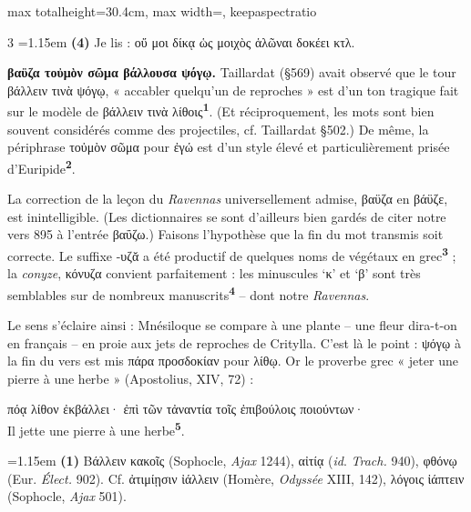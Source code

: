 \documentclass[11pt,twoside]{book}
\newcommand{\italique}[1]{\textit{#1}}
\newcommand{\citComm}[1]{\begin{quoting}[vskip=0.4pt,leftmargin=0.7em,rightmargin=0.2em]#1\end{quoting}}
\newcommand{\marqueur}[1]{\textsuperscript{\color{rubricRed}\textbf{#1}}}
\begin{document}
\begin{adjustbox}{max totalheight=30.4cm, max width=\textwidth, keepaspectratio}
\begin{minipage}{\textwidth}
{\begin{multicols}{3}
\noindent\hangindent=1.15em {\color{sepiaNote}\textbf{(4)}} Je lis : οὔ μοι δίκᾳ ὡς μοιχὸς ἁλῶναι δοκέει κτλ.
\par\vspace{1.5pt}
 \textbf{βαϋζα τοὐμὸν σῶμα βάλλουσα ψόγῳ.} Taillardat (§569) avait observé que le tour βάλλειν τινὰ ψόγῳ, « accabler quelqu'un de reproches » est d'un ton tragique fait sur le modèle de βάλλειν τινὰ λίθοις\marqueur{1}. (Et réciproquement, les mots sont bien souvent considérés comme des projectiles, cf. Taillardat §502.)  De même, la périphrase τοὐμὸν σῶμα pour ἐγώ est d'un style élevé et particulièrement prisée d'Euripide\marqueur{2}.
\par\vspace{1.5pt}
\noindent La correction de la leçon du \italique{Ravennas} universellement admise, βαϋζα en βάϋζε, est inintelligible. (Les dictionnaires se sont d'ailleurs bien gardés de citer notre vers 895 à l'entrée βαΰζω.) Faisons l'hypothèse que la fin du mot transmis soit correcte. Le suffixe -υζᾰ a été productif de quelques noms de végétaux en grec\marqueur{3} ; la \italique{conyze}, κόνυζα convient parfaitement : les minuscules `κ' et `β' sont très semblables sur de nombreux manuscrits\marqueur{4} -- dont notre \italique{Ravennas}.
\par\vspace{1.5pt}
\noindent Le sens s'éclaire ainsi : Mnésiloque se compare à une plante -- une fleur dira-t-on en français -- en proie aux jets de reproches de Critylla. C'est là le point : ψόγῳ à la fin du vers est mis πάρα προσδοκίαν pour λίθῳ. Or le proverbe grec « jeter une pierre à une herbe » (Apostolius, XIV, 72) :
\citComm{πόᾳ λίθον ἐκβάλλει· ἐπὶ τῶν τἀναντία τοῖς ἐπιβούλοις ποιούντων·\\
Il jette une pierre à une herbe\marqueur{5}.}
\par\vspace{1.5pt}
\par\vspace{1.2pt}\par\nopagebreak\vspace{1pt}\noindent\hangindent=1.15em {\color{sepiaNote}\textbf{(1)}} Βάλλειν κακοῖς (Sophocle, \italique{Ajax} 1244), αἰτίᾳ (\italique{id}. \italique{Trach.} 940), φθόνῳ (Eur. \italique{Élect.} 902). Cf. ἀτιμίῃσιν ἰάλλειν (Homère, \italique{Odyssée} XIII, 142), λόγοις ἰάπτειν (Sophocle, \italique{Ajax} 501).

\end{multicols}}
\end{minipage}
\end{adjustbox}
\end{document}

